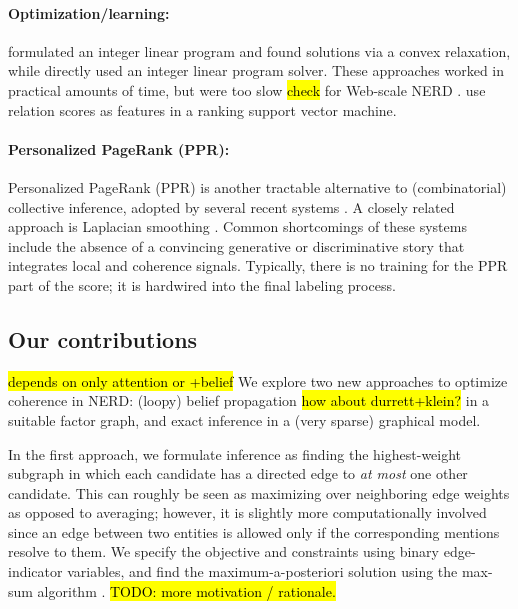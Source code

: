 \paragraph*{Optimization/learning:}
 formulated an integer linear program and found solutions via a convex relaxation, while  directly used an integer linear program solver.  These approaches worked in practical amounts of time, but were too slow \hl{check} for Web-scale NERD \cite{Lazic2015}.   use relation scores as features in a ranking support vector machine.

\paragraph*{Personalized PageRank (PPR):}
Personalized PageRank (PPR) \cite{jeh2003scaling} is another tractable alternative to (combinatorial) collective inference, adopted by several recent systems \cite{Han2011,He13,Alhelbawy14,Pershina2015}.
A closely related approach is Laplacian smoothing \cite{Huang2014}.  Common shortcomings of these systems include the absence of a convincing generative or discriminative story that integrates local and coherence signals.  Typically, there is no training for the PPR part of the score; it is hardwired into the final labeling process. 


\subsection{Our contributions}
\label{sec:intro:our}

\hl{depends on only attention or +belief}
We explore two new approaches to optimize coherence in NERD: (loopy) belief propagation \hl{how about durrett+klein?} in a suitable factor graph, and exact inference in a (very sparse) graphical model.

In the first approach, we formulate inference as finding the highest-weight subgraph in which each candidate has a directed edge to \emph{at most} one other candidate. This can roughly be seen as maximizing over neighboring edge weights as opposed to averaging; however, it is slightly more computationally involved since an edge between two entities is allowed only if the corresponding mentions resolve to them. We specify the objective and constraints using binary edge-indicator variables, and find the maximum-a-posteriori solution using the max-sum algorithm \cite{Kschischang2001}.  \hl{TODO: more motivation / rationale.}

